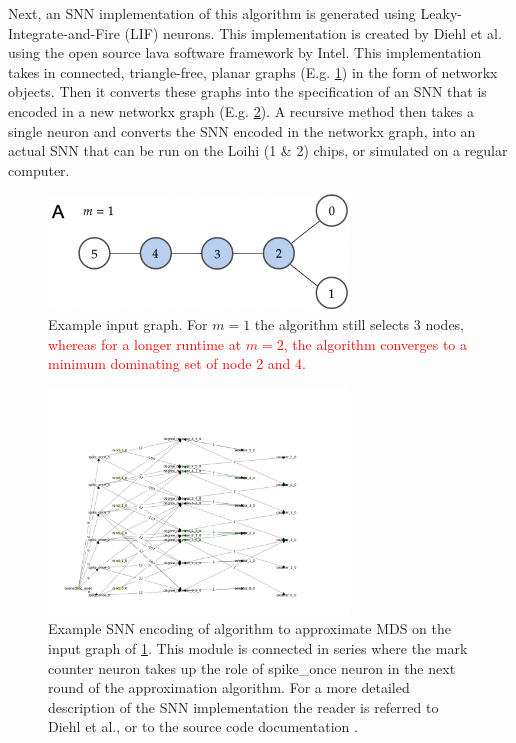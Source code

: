 Next, an SNN implementation of this algorithm is generated using Leaky-Integrate-and-Fire (LIF) neurons. This implementation is created by Diehl et al. \cite{diehl} using the open source lava software framework by Intel. This implementation takes in connected, triangle-free, planar graphs (E.g. \cref{fig:input_graph}) in the form of networkx objects. Then it converts these graphs into the specification of an SNN that is encoded in a new networkx graph (E.g. \cref{fig:encoded_snn}). A recursive method then takes a single neuron and converts the SNN encoded in the networkx graph, into an actual SNN that can be run on the Loihi (1 \& 2) chips, or simulated on a regular computer.
\begin{figure}[H]
    \centering
    \includegraphics[width=8cm]{latex/Images/input_graph_G_6_0_alternative1.png}
    \caption{Example input graph. For $m=1$ the algorithm still selects 3 nodes, \textcolor{red}{whereas for a longer runtime at $m=2$, the algorithm converges to a minimum dominating set of node 2 and 4.}}
    \label{fig:input_graph}
\end{figure}

\begin{figure}[H]
    \centering
    \includegraphics[width=8cm]{latex/Images/structured_graph_snn_m0_n6_iter0_t77.png}
    \caption{Example SNN encoding of algorithm to approximate MDS on the input graph of \cref{fig:input_graph}. This module is connected in series where the mark counter neuron takes up the role of spike\_once neuron in the next round of the approximation algorithm. For a more detailed description of the SNN implementation the reader is referred to Diehl et al., or to the source code documentation \cite{}. %
    }
    \label{fig:encoded_snn}
\end{figure}

